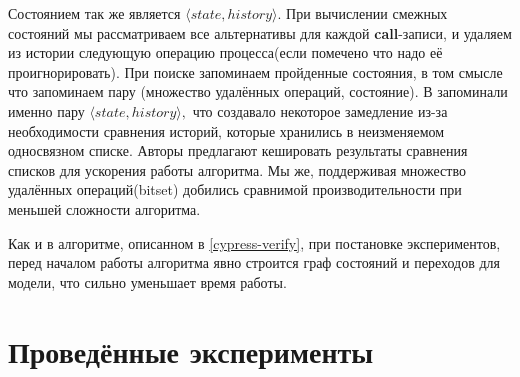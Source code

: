 \documentclass[pdftex,ptm,14pt,a4paper]{extreport}
\theoremstyle{definition}
\begin{document}
Состоянием так же является $\langle state, history \rangle.$
При вычислении смежных состояний мы рассматриваем все альтернативы для каждой \textbf{call}-записи, и удаляем
из истории следующую операцию процесса(если помечено что надо её проигнорировать).
При поиске запоминаем пройденные состояния, в том смысле что запоминаем пару (множество удалённых операций, состояние).
В \cite{horn-faster} запоминали именно пару $\langle state, history \rangle,$ что создавало некоторое замедление из-за
необходимости сравнения историй, которые хранились в неизменяемом односвязном списке. Авторы предлагают кешировать результаты
сравнения списков для ускорения работы алгоритма. Мы же, поддерживая множество удалённых операций(bitset) добились сравнимой
производительности при меньшей сложности алгоритма.

Как и в алгоритме, описанном в \ref{cypress-verify}, при постановке экспериментов,
перед началом работы алгоритма явно строится
граф состояний и переходов для модели, что сильно уменьшает время работы.

\chapter{Проведённые эксперименты}
\end{document}
